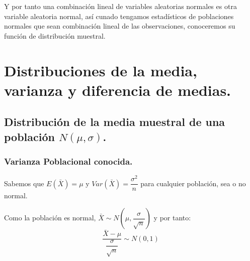 Y por tanto una combinaci\'on lineal de variables aleatorias normales es otra variable aleatoria normal, as\'i cunado tengamos estad\'isticos de poblaciones normales que sean combinaci\'on lineal de las observaciones, conoceremos su funci\'on de distribuci\'on muestral.

\section{Distribuciones de la media, varianza y diferencia de medias.}

\subsection{Distribuci\'on de la media muestral de una poblaci\'on $N(\mu,\sigma)$.}

\subsubsection{Varianza Poblacional conocida.}

Sabemos que $E(\bar{X})=\mu$ y $Var(\bar{X})=\dfrac{\sigma^2}{n}$ para cualquier poblaci\'on, sea o no normal.

Como la poblaci\'on es normal, $\bar{X}\sim N(\mu,\dfrac{\sigma}{\sqrt{n}})$ y por tanto:
\begin{equation*}
\dfrac{\bar{X}-\mu}{\dfrac{\sigma}{\sqrt{n}}}\sim N(0,1)
\end{equation*}
